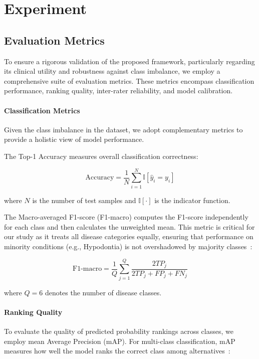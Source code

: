 \section{Experiment}
\label{sec:experiment}

\subsection{Evaluation Metrics}
\label{sec:metrics}

To ensure a rigorous validation of the proposed framework, particularly regarding its clinical utility and robustness against class imbalance, we employ a comprehensive suite of evaluation metrics. These metrics encompass classification performance, ranking quality, inter-rater reliability, and model calibration.

\paragraph{Classification Metrics}
Given the class imbalance in the dataset, we adopt complementary metrics to provide a holistic view of model performance.

\vspace{0.5em}

The Top-1 Accuracy measures overall classification correctness:

\begin{equation}
\text{Accuracy} = \frac{1}{N} \sum_{i=1}^{N} \mathbb{I}[\hat{y}_i = y_i]
\end{equation}

where $N$ is the number of test samples and $\mathbb{I}[\cdot]$ is the indicator function.

The Macro-averaged F1-score (F1-macro) computes the F1-score independently for each class and then calculates the unweighted mean. This metric is critical for our study as it treats all disease categories equally, ensuring that performance on minority conditions (e.g., Hypodontia) is not overshadowed by majority classes~\cite{tsoumakas2007multi}:

\begin{equation}
\text{F1-macro} = \frac{1}{Q} \sum_{j=1}^{Q} \frac{2 TP_j}{2 TP_j + FP_j + FN_j}
\end{equation}

where $Q = 6$ denotes the number of disease classes.

\paragraph{Ranking Quality}
To evaluate the quality of predicted probability rankings across classes, we employ mean Average Precision (mAP). For multi-class classification, mAP measures how well the model ranks the correct class among alternatives~\cite{zhang2014review}:

